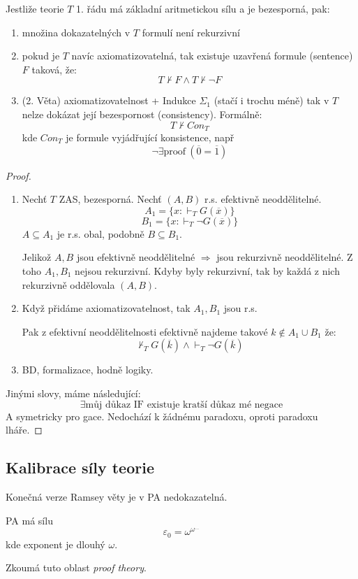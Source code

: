 \begin{theorem}\label{godel}
	Jestliže teorie $T$ 1. řádu má základní aritmetickou sílu a je bezesporná, pak:
	\begin{enumerate}
		\item množina dokazatelných v $T$ formulí není rekurzivní
		\item pokud je $T$ navíc axiomatizovatelná, tak existuje uzavřená formule (sentence) $F$ taková, že:
			\[ T \nvdash F \land T \nvdash \neg F \]
		\item (2. Věta) axiomatizovatelnost + Indukce $\Sigma_1$ (stačí i trochu méně) tak v $T$ nelze dokázat její bezespornost (consistency).
		Formálně:
		\[ T \nvdash Con_T \]
		kde $Con_T$ je formule vyjádřující konsistence, např
		\[ \neg \exists \text{proof}\ (\overline{0} = \overline{1}) \]
	\end{enumerate}
\end{theorem}
\begin{proof}~
	\begin{enumerate}
		\item Nechť $T$ ZAS, bezesporná. Nechť $(A, B)$ r.s. efektivně neoddělitelné.
			\[ A_1 = \{ x: \vdash_T G(\overline{x}) \} \]
			\[ B_1 = \{ x: \vdash_T \neg G(\overline{x}) \} \]
			$A \subseteq A_1$ je r.s. obal, podobně $B \subseteq B_1$.

			Jelikož $A, B$ jsou efektivně neoddělitelné $\Rightarrow$ jsou rekurzivně neoddělitelné.
			Z toho $A_1, B_1$ nejsou rekurzivní.
			Kdyby byly rekurzivní, tak by každá z nich rekurzivně oddělovala $(A,B)$.

		\item Když přidáme axiomatizovatelnost, tak $A_1, B_1$  jsou r.s.

			Pak z efektivní neoddělitelnosti efektivně najdeme takové $k \notin A_1 \cup B_1$ že:
			\[ \nvdash_T G(\overline{k}) \land \vdash_T \neg G(\overline{k}) \]
		\item BD, formalizace, hodně logiky.
	\end{enumerate}

	Jinými slovy, máme následující:
	\[ \exists \text{můj důkaz IF existuje kratší důkaz mé negace} \]
	A symetricky pro gace. Nedochází k žádnému paradoxu, oproti paradoxu lháře.
\end{proof}

\subsection{Kalibrace síly teorie}

\begin{note}
	Konečná verze Ramsey věty je v PA nedokazatelná.
\end{note}

\begin{note}
	PA má sílu
	\[ \varepsilon_0 = \omega^{\omega^{\ldots}} \]
	kde exponent je dlouhý $\omega$.


	Zkoumá tuto oblast \emph{proof theory}.
\end{note}
